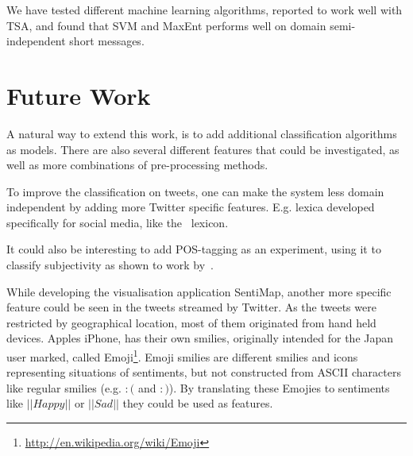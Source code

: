 We have tested different machine learning algorithms, reported to work well with TSA, and found that SVM and MaxEnt performs well on domain semi-independent short messages. 

\section{Future Work}

A natural way to extend this work, is to add additional classification algorithms as models. There are also several different features that could be investigated, as well as more combinations of pre-processing methods.

To improve the classification on tweets, one can make the system less domain independent by adding more Twitter specific features. E.g. lexica developed specifically for social media, like the~\citet{article:afinn} lexicon.

It could also be interesting to add POS-tagging as an experiment, using it to classify subjectivity as shown to work by~\citet{article:pak}.

While developing the visualisation application SentiMap, another more specific feature could be seen in the tweets streamed by Twitter. As the tweets were restricted by geographical location, most of them originated from hand held devices. Apples iPhone, has their own smilies, originally intended for the Japan user marked, called Emoji\footnote{\url{http://en.wikipedia.org/wiki/Emoji}}. Emoji smilies are different smilies and icons representing situations of sentiments, but not constructed from ASCII characters like regular smilies (e.g. $:($ and $:)$). By translating these Emojies to sentiments like $||Happy||$ or $||Sad||$ they could be used as features.